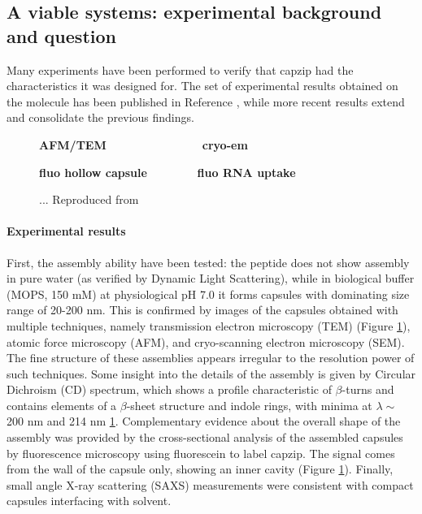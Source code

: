 
\subsection{A viable systems: experimental background and question}
Many experiments have been performed to verify that capzip had the characteristics it was designed for. The set of experimental results obtained on the molecule has been published in Reference \cite{Castelletto2016}, while more recent results extend and consolidate the previous findings.

\begin{figure}
\begin{center}
\textbf{AFM/TEM \ \ \ \ \ \ \ \ \ \ \ \ \ \ cryo-em}
\bigskip

\textbf{fluo hollow capsule \ \ \ \ \ \ \ fluo RNA uptake}
\caption[Experimental results on capzip]{... Reproduced from \cite{Castelletto2016}} \label{fig:exp_capzip}
\end{center}
\end{figure}

\paragraph{Experimental results} First, the assembly ability have been tested: the peptide does not show assembly in pure water (as verified by Dynamic Light Scattering), while in biological buffer (MOPS, 150 mM) at physiological pH 7.0 it forms capsules with dominating size range of 20-200 nm. This is confirmed by images of the capsules obtained with multiple techniques, namely transmission electron microscopy (TEM) (Figure \ref{fig:exp_capzip}), atomic force microscopy (AFM), and cryo-scanning electron microscopy (SEM).
%
The fine structure of these assemblies appears irregular to the resolution power of such techniques. Some insight into the details of the assembly is given by Circular Dichroism (CD) spectrum, which shows a profile characteristic of $\beta$-turns and contains elements of a $\beta$-sheet structure and indole rings, with minima at $\lambda \sim$ 200 nm and 214 nm \ref{fig:exp_capzip}.
%
Complementary evidence about the overall shape of the assembly was provided by the cross-sectional analysis of the assembled capsules by fluorescence microscopy using fluorescein to label capzip. The signal comes from the wall of the capsule only, showing an inner cavity (Figure \ref{fig:exp_capzip}).
%
Finally, small angle X-ray scattering (SAXS) measurements were consistent with compact capsules interfacing with solvent.

